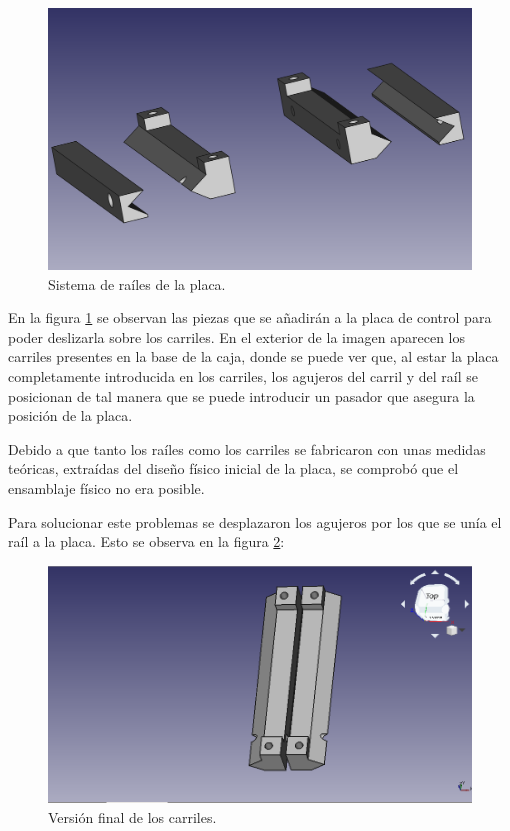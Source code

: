  \begin{figure}[H]
    \centering
    \includegraphics[width=.9\linewidth]{pictures/railes.png}
    \caption{Sistema de raíles de la placa.}
    \label{fig:railes_placa}
\end{figure}

En la figura \ref{fig:railes_placa} se observan las piezas que se añadirán a la placa de control para poder deslizarla sobre los carriles. En el exterior de la imagen aparecen los carriles presentes en la base de la caja, donde se puede ver que, al estar la placa completamente introducida en los carriles, los agujeros del carril y del raíl se posicionan de tal manera que se puede introducir un pasador que asegura la posición de la placa.

Debido a que tanto los raíles como los carriles se fabricaron con unas medidas teóricas, extraídas del diseño físico inicial de la placa, se comprobó que el ensamblaje físico no era posible.

Para solucionar este problemas se desplazaron los agujeros por los que se unía el raíl a la placa. Esto se observa en la figura \ref{fig:railes_placa_final}:

 \begin{figure}[H]
    \centering
    \includegraphics[width=.9\linewidth]{pictures/RailesBien.png}
    \caption{Versión final de los carriles.}
    \label{fig:railes_placa_final}
\end{figure}

